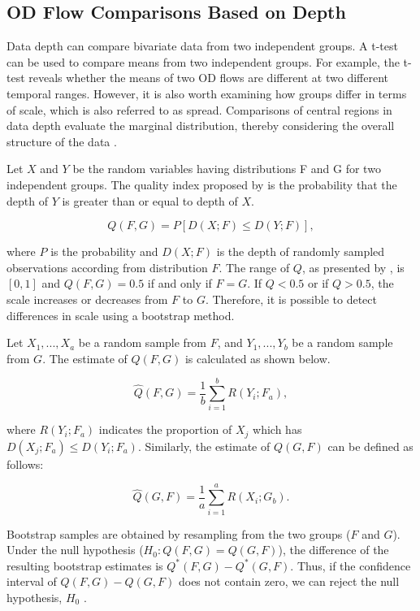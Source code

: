 \documentclass[a4paper,UKenglish]{lipics-v2018}
\begin{document}
\subsection{OD Flow Comparisons Based on Depth}
Data depth can compare bivariate data from two independent groups.
A t-test can be used to compare means from two independent groups.
For example, the t-test reveals whether the means of two OD flows are different at two different temporal ranges.
However, it is also worth examining how groups differ in terms of scale, which is also referred to as spread.
Comparisons of central regions in data depth evaluate the marginal distribution, thereby considering the overall structure of the data \cite{wilcox03MBR}.

Let $X$ and $Y$ be the random variables having distributions F and G for two independent groups.
The quality index proposed by \cite{liu93JASA} is the probability that the depth of $Y$ is greater than or equal to depth of $X$. 

\begin{equation*}
Q(F,G) = P[D(X;F) \leq D(Y;F)],
\end{equation*}

where $P$ is the probability and $D(X;F)$ is the depth of randomly sampled observations according from distribution $F$.
The range of $Q$, as presented by \cite{liu93JASA}, is $[0,1]$ and $Q(F,G) = 0.5$ if and only if $F = G$. If $Q < 0.5$  or if $Q > 0.5$, the scale increases or decreases from  $F$ to $G$.
Therefore, it is possible to detect differences in scale using a bootstrap method.

Let $X_1,...,X_a$ be a random sample from $F$, and $Y_1,...,Y_b$ be a random sample from $G$.
The estimate of $Q(F,G)$ is calculated as shown below.

\begin{equation*}
\hat{Q}(F,G) =\frac{1}{b} \sum_{i=1}^{b} R(Y_i;F_a),
\end{equation*}

where $R(Y_i;F_a)$ indicates the proportion of $X_j$ which has $D(X_j;F_a) \leq D(Y_i;F_a)$.
Similarly, the estimate of $Q(G,F)$ can be defined as follows:

\begin{equation*}
\hat{Q}(G,F) =\frac{1}{a} \sum_{i=1}^{a} R(X_i;G_b).
\end{equation*}

Bootstrap samples are obtained by resampling from the two groups ($F$ and $G$). Under the null hypothesis ($H_0: Q(F,G) = Q(G,F)$), the difference of the resulting bootstrap estimates is $Q^*(F,G) - Q^*(G,F)$. Thus, if the confidence interval of $Q(F,G) - Q(G,F)$ does not contain zero, we can reject the null hypothesis, $H_0$ \cite{liu93JASA,wilcox03MBR}.
\end{document}
